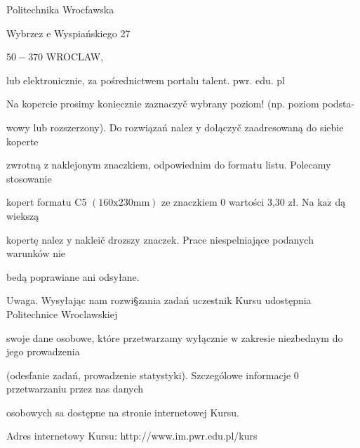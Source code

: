 \documentclass[a4paper,12pt]{article}
\begin{document}
Politechnika Wrocfawska

Wybrzez $\mathrm{e}$ Wyspiańskiego 27

$50-370$ WROCLAW,

lub elektronicznie, za pośrednictwem portalu talent. $\mathrm{p}\mathrm{w}\mathrm{r}$. edu. pl

Na kopercie prosimy $\underline{\mathrm{k}\mathrm{o}\mathrm{n}\mathrm{i}\mathrm{e}\mathrm{c}\mathrm{z}\mathrm{n}\mathrm{i}\mathrm{e}}$ zaznaczyč wybrany poziom! (np. poziom podsta-

wowy lub rozszerzony). Do rozwiązań nalez $\mathrm{y}$ dołączyč zaadresowaną do siebie koperte

zwrotną $\mathrm{z}$ naklejonym znaczkiem, odpowiednim do formatu listu. Polecamy stosowanie

kopert formatu C5 $(160\mathrm{x}230\mathrm{m}\mathrm{m})$ ze znaczkiem $0$ wartości 3,30 zł. Na $\mathrm{k}\mathrm{a}\dot{\mathrm{z}}$ dą wiekszą

kopertę nalez $\mathrm{y}$ nakleič drozszy znaczek. Prace niespelniające podanych warunków nie

bedą poprawiane ani odsyłane.

Uwaga. Wysyłając nam rozwi\S zania zadań uczestnik Kursu udostępnia Politechnice Wroclawskiej

swoje dane osobowe, które przetwarzamy wyłącznie $\mathrm{w}$ zakresie niezbednym do jego prowadzenia

(odesfanie zadań, prowadzenie statystyki). Szczególowe informacje $0$ przetwarzaniu przez nas danych

osobowych sa dostępne na stronie internetowej Kursu.

Adres internetowy Kursu: http://www.im.pwr.edu.pl/kurs
\end{document}
